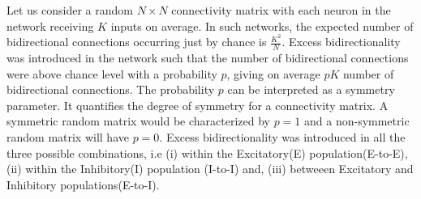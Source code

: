 Let us consider a random $N \times N$ connectivity matrix with each neuron in the network receiving $K$ inputs on average. In such networks, the expected number of bidirectional connections occurring just by chance is $\frac{K^2}{N}$. Excess bidirectionality was introduced in the network such that the number of bidirectional connections were above chance level with a probability $p$, giving on average $pK$ number of bidirectional connections. The probability $p$ can be interpreted as a symmetry parameter. It quantifies the degree of symmetry for a connectivity matrix. A symmetric random matrix would be characterized by $p = 1$ and a non-symmetric random matrix will have $p = 0$. %
Excess bidirectionality was introduced in all the three possible combinations, i.e (i) within the Excitatory(E) population(E-to-E), (ii) within the Inhibitory(I) population (I-to-I) and, (iii) betweeen Excitatory and Inhibitory populations(E-to-I). \\

